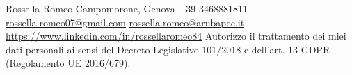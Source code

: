 \documentclass[lighthipster]{simple-hipster}
\newlength{\rightcolwidth}
\begin{document}
\begin{paracol}{2}
\vfill{} %

\setlength{\parindent}{0pt}
\begin{minipage}[t]{\rightcolwidth}
\begin{center}\fontfamily{\sfdefault}\selectfont \color{black!70}
{
  \footnotesize Rossella Romeo
   Campomorone, Genova
   +39 3468881811
  \newline
   \protect\url{rossella.romeo07@gmail.com}
   \protect\url{rossella.romeo@arubapec.it}
  \newline
   \protect\url{https://www.linkedin.com/in/rossellaromeo84}
  \newline
  \newline
  \tiny{Autorizzo il trattamento dei miei dati personali ai sensi del Decreto Legislativo 101/2018 e dell'art. 13 GDPR (Regolamento UE 2016/679).}
}
\end{center}
\end{minipage}

\end{paracol}
\end{document}
